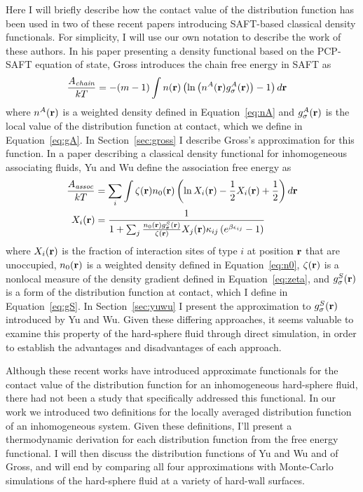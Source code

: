 Here I will briefly describe how the contact value of the distribution
function has been used in two of these recent papers introducing
SAFT-based classical density functionals.  For simplicity, I will use
our own notation to describe the work of these authors.  In his paper
presenting a density functional based on the PCP-SAFT equation of
state\cite{gross2009density}, Gross introduces the chain free energy
in SAFT as
\begin{align}
  \frac{A_\textit{chain}}{kT} &= -(m-1) \int n(\textbf{r}) \left(\ln\left(n^A(\textbf{r})
  g_\sigma^A(\textbf{r}) \right)-1\right) d\textbf{r} \label{eq:Achain}
\end{align}
where $n^A(\textbf{r})$ is a weighted density defined in Equation~\ref{eq:nA}
and $g_\sigma^A(\textbf{r})$ is the local value of the distribution function
at contact, which we define in Equation~\ref{eq:gA}.  In
Section~\ref{sec:gross} I describe Gross's approximation for this
function. In a paper describing a classical density functional for
inhomogeneous associating
fluids\cite{yu2002fmt-dft-inhomogeneous-associating}, Yu and Wu define
the association free energy as
\begin{align}
  \frac{A_\textit{assoc}}{kT} &= \sum_i \int \zeta(\textbf{r})n_0(\textbf{r}) \left(\ln X_i(\textbf{r}) - \frac12
  X_i(\textbf{r}) + \frac12\right) d\textbf{r} \label{eq:Aassoc} \\
  X_i(\textbf{r}) &= \frac{1}{1 + \sum_j \frac{n_0(\textbf{r}) g_\sigma^{S}(\textbf{r})}{\zeta(\textbf{r})}
                                 X_j(\textbf{r})\kappa_{ij} \left(e^{\beta
                                   \epsilon_{ij}}-1\right)}
  \label{eq:X}
\end{align}
where $X_i(\textbf{r})$ is the fraction of interaction sites of type $i$ at
position $\textbf{r}$ that are unoccupied, $n_0(\textbf{r})$ is a weighted density
defined in Equation~\ref{eq:n0}, $\zeta(\textbf{r})$ is a nonlocal measure of
the density gradient defined in Equation~\ref{eq:zeta}, and
$g_\sigma^S(\textbf{r})$ is a form of the distribution function at contact,
which I define in Equation~\ref{eq:gS}.  In Section~\ref{sec:yuwu} I
present the approximation to $g_\sigma^S(\textbf{r})$ introduced by Yu and
Wu.  Given these differing approaches, it seems valuable to examine
this property of the hard-sphere fluid through direct simulation, in
order to establish the advantages and disadvantages of each approach.

Although these recent works have introduced approximate functionals
for the contact value of the distribution function for an
inhomogeneous hard-sphere
fluid\cite{yu2002fmt-dft-inhomogeneous-associating, gross2009density},
there had not been a study that specifically addressed this
functional.
%
In our work we introduced two definitions for the locally averaged
distribution function of an inhomogeneous system.
%
%
Given these definitions, I'll present a thermodynamic derivation for
each distribution function from the free energy functional.  I will
then discuss the distribution functions of Yu and Wu and of Gross, and
will end by comparing all four approximations with Monte-Carlo
simulations of the hard-sphere fluid at a variety of hard-wall
surfaces.


